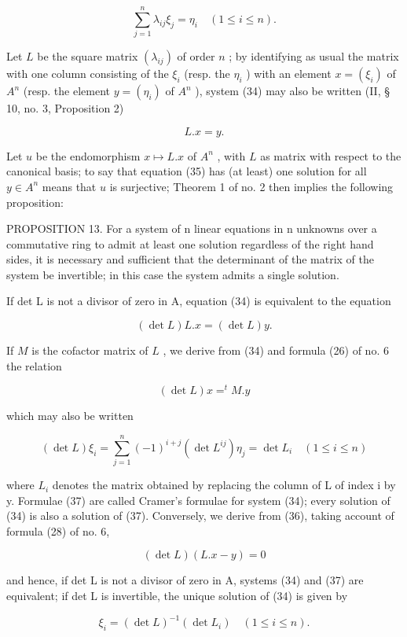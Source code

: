 \[
\sum_ {j = 1} ^ {n} \lambda_ {i j} \xi_ {j} = \eta_ {i} \quad (1 \leqslant i \leqslant n).\tag{34}
\]

Let \(L\) be the square matrix \((\lambda_{ij})\) of order \(n\) ; by identifying as usual the matrix with one column consisting of the \(\xi_i\) (resp. the \(\eta_i\) ) with an element \(x = (\xi_i)\) of \(A^n\) (resp. the element \(y = (\eta_i)\) of \(A^n\) ), system (34) may also be written (II, § 10, no. 3, Proposition 2)

\[
L. x = y.\tag{35}
\]

Let \(u\) be the endomorphism \(x \mapsto L.x\) of \(A^n\) , with \(L\) as matrix with respect to the canonical basis; to say that equation (35) has (at least) one solution for all \(y \in A^n\) means that \(u\) is surjective; Theorem 1 of no. 2 then implies the following proposition:

PROPOSITION 13. For a system of n linear equations in n unknowns over a commutative ring to admit at least one solution regardless of the right hand sides, it is necessary and sufficient that the determinant of the matrix of the system be invertible; in this case the system admits a single solution.

If det L is not a divisor of zero in A, equation (34) is equivalent to the equation

\[
(\det L) L. x = (\det L) y.
\]

If \(M\) is the cofactor matrix of \(L\) , we derive from (34) and formula (26) of no. 6 the relation

\[
(\det L) x = ^ {t} M. y\tag{36}
\]

which may also be written

\[
(\det L) \xi_ {i} = \sum_ {j = 1} ^ {n} (- 1) ^ {i + j} (\det L ^ {i j}) \eta_ {j} = \det L _ {i} \quad (1 \leqslant i \leqslant n)\tag{37}
\]

where \(L_{i}\) denotes the matrix obtained by replacing the column of L of index i by y. Formulae (37) are called Cramer's formulae for system (34); every solution of (34) is also a solution of (37). Conversely, we derive from (36), taking account of formula (28) of no. 6,

\[
(\det L) (L. x - y) = 0\tag{38}
\]

and hence, if det L is not a divisor of zero in A, systems (34) and (37) are equivalent; if det L is invertible, the unique solution of (34) is given by

\[
\xi_ {i} = (\det L) ^ {- 1} (\det L _ {i}) \quad (1 \leqslant i \leqslant n).\tag{39}
\]

